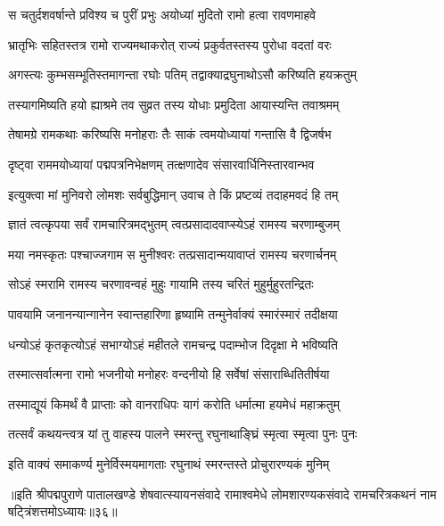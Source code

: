 \twolineshloka
{स चतुर्दशवर्षान्ते प्रविश्य च पुरीं प्रभुः}
{अयोध्यां मुदितो रामो हत्वा रावणमाहवे}%

\twolineshloka
{भ्रातृभिः सहितस्तत्र रामो राज्यमथाकरोत्}
{राज्यं प्रकुर्वतस्तस्य पुरोधा वदतां वरः}%

\twolineshloka
{अगस्त्यः कुम्भसम्भूतिस्तमागन्ता रघोः पतिम्}
{तद्वाक्याद्रघुनाथोऽसौ करिष्यति हयक्रतुम्}%

\twolineshloka
{तस्यागमिष्यति हयो ह्याश्रमे तव सुव्रत}
{तस्य योधाः प्रमुदिता आयास्यन्ति तवाश्रमम्}%

\twolineshloka
{तेषामग्रे रामकथाः करिष्यसि मनोहराः}
{तैः साकं त्वमयोध्यायां गन्तासि वै द्विजर्षभ}%

\twolineshloka
{दृष्ट्वा राममयोध्यायां पद्मपत्रनिभेक्षणम्}
{तत्क्षणादेव संसारवार्धिनिस्तारवान्भव}%

\twolineshloka
{इत्युक्त्वा मां मुनिवरो लोमशः सर्वबुद्धिमान्}
{उवाच ते किं प्रष्टव्यं तदाहमवदं हि तम्}%

\twolineshloka
{ज्ञातं त्वत्कृपया सर्वं रामचारित्रमद्भुतम्}
{त्वत्प्रसादादवाप्स्येऽहं रामस्य चरणाम्बुजम्}%

\twolineshloka
{मया नमस्कृतः पश्चाज्जगाम स मुनीश्वरः}
{तत्प्रसादान्मयावाप्तं रामस्य चरणार्चनम्}%

\twolineshloka
{सोऽहं स्मरामि रामस्य चरणावन्वहं मुहुः}
{गायामि तस्य चरितं मुहुर्मुहुरतन्द्रितः}%

\twolineshloka
{पावयामि जनानन्यान्गानेन स्वान्तहारिणा}
{हृष्यामि तन्मुनेर्वाक्यं स्मारंस्मारं तदीक्षया}%

\twolineshloka
{धन्योऽहं कृतकृत्योऽहं सभाग्योऽहं महीतले}
{रामचन्द्र पदाम्भोज दिदृक्षा मे भविष्यति}%

\twolineshloka
{तस्मात्सर्वात्मना रामो भजनीयो मनोहरः}
{वन्दनीयो हि सर्वेषां संसाराब्धितितीर्षया}%

\twolineshloka
{तस्माद्यूयं किमर्थं वै प्राप्ताः को वानराधिपः}
{यागं करोति धर्मात्मा हयमेधं महाक्रतुम्}%

\twolineshloka
{तत्सर्वं कथयन्त्वत्र यां तु वाहस्य पालने}
{स्मरन्तु रघुनाथाङ्घ्रिं स्मृत्वा स्मृत्वा पुनः पुनः}%

\twolineshloka
{इति वाक्यं समाकर्ण्य मुनेर्विस्मयमागताः}
{रघुनाथं स्मरन्तस्ते प्रोचुरारण्यकं मुनिम्}%

{॥इति श्रीपद्मपुराणे पातालखण्डे शेषवात्स्यायनसंवादे रामाश्वमेधे लोमशारण्यकसंवादे रामचरित्रकथनं नाम षट्त्रिंशत्तमोऽध्यायः॥३६॥}

\resetShloka


